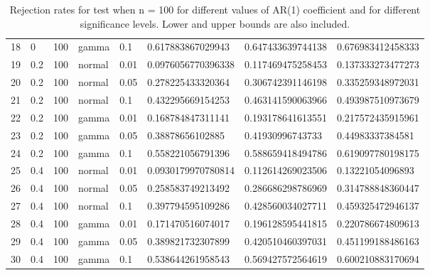 \begin{table}[ht]
\begin{tabular}{rlllllll}
  18 & 0 & 100 & gamma & 0.1 & 0.617883867029943 & 0.647433639744138 & 0.676983412458333 \\ 
  19 & 0.2 & 100 & normal & 0.01 & 0.0976056770396338 & 0.117469475258453 & 0.137333273477273 \\ 
  20 & 0.2 & 100 & normal & 0.05 & 0.278225433320364 & 0.306742391146198 & 0.335259348972031 \\ 
  21 & 0.2 & 100 & normal & 0.1 & 0.432295669154253 & 0.463141590063966 & 0.493987510973679 \\ 
  22 & 0.2 & 100 & gamma & 0.01 & 0.168784847311141 & 0.193178641613551 & 0.217572435915961 \\ 
  23 & 0.2 & 100 & gamma & 0.05 & 0.38878656102885 & 0.41930996743733 & 0.44983337384581 \\ 
  24 & 0.2 & 100 & gamma & 0.1 & 0.558221056791396 & 0.588659418494786 & 0.619097780198175 \\ 
  25 & 0.4 & 100 & normal & 0.01 & 0.0930179970780814 & 0.112614269023506 & 0.13221054096893 \\ 
  26 & 0.4 & 100 & normal & 0.05 & 0.258583749213492 & 0.286686298786969 & 0.314788848360447 \\ 
  27 & 0.4 & 100 & normal & 0.1 & 0.397794595109286 & 0.428560034027711 & 0.459325472946137 \\ 
  28 & 0.4 & 100 & gamma & 0.01 & 0.171470516074017 & 0.196128595441815 & 0.220786674809613 \\ 
  29 & 0.4 & 100 & gamma & 0.05 & 0.389821732307899 & 0.420510460397031 & 0.451199188486163 \\ 
  30 & 0.4 & 100 & gamma & 0.1 & 0.538644261958543 & 0.569427572564619 & 0.600210883170694 \\ 
   \hline
\end{tabular}
\caption{Rejection rates for test when n = 100 for 
                   different values of AR(1) coefficient and for different 
                   significance levels. Lower and upper bounds are also 
                   included.} 
\label{rr_100}
\end{table}

